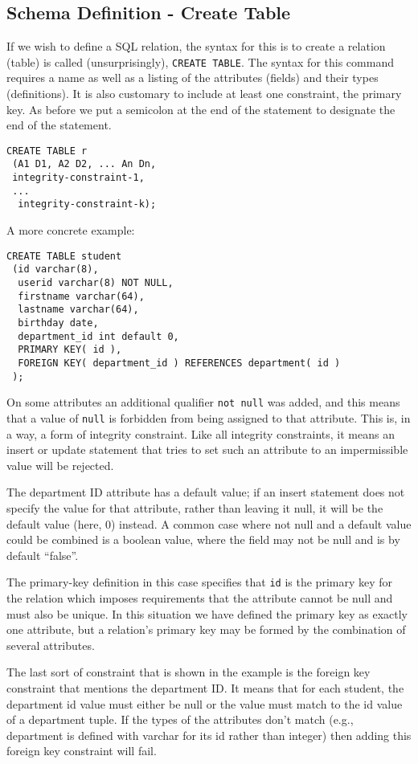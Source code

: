 \subsection*{Schema Definition - Create Table} 
If we wish to define a SQL relation, the syntax for this is to create a relation (table) is called (unsurprisingly), \texttt{CREATE TABLE}. The syntax for this command requires a name as well as a listing of the attributes (fields) and their types (definitions). It is also customary to include at least one constraint, the primary key. As before we put a semicolon at the end of the statement to designate the end of the statement. 

{\small
\begin{verbatim}
CREATE TABLE r
 (A1 D1, A2 D2, ... An Dn,
 integrity-constraint-1,
 ...
  integrity-constraint-k);
\end{verbatim}
}

A more concrete example: 
{\small
\begin{verbatim}
CREATE TABLE student
 (id varchar(8),
  userid varchar(8) NOT NULL,
  firstname varchar(64),
  lastname varchar(64),
  birthday date,
  department_id int default 0,
  PRIMARY KEY( id ),
  FOREIGN KEY( department_id ) REFERENCES department( id )
 );
\end{verbatim}
}


On some attributes an additional qualifier \texttt{not null} was added, and this means that a value of \texttt{null} is forbidden from being assigned to that attribute. This is, in a way, a form of integrity constraint. Like all integrity constraints, it means an insert or update statement that tries to set such an attribute to an impermissible value will be rejected. 

The department ID attribute has a default value; if an insert statement does not specify the value for that attribute, rather than leaving it null, it will be the default value (here, 0) instead. A common case where not null and a default value could be combined is a boolean value, where the field may not be null and is by default ``false''.

The primary-key definition in this case specifies that \texttt{id} is the primary key for the relation which imposes requirements that the attribute cannot be null and must also be unique. In this situation we have defined the primary key as exactly one attribute, but a relation's primary key may be formed by the combination of several attributes. 
 
The last sort of constraint that is shown in the example is the foreign key constraint that mentions the department ID. It means that for each student, the department id value must either be null or the value must match to the id value of a department tuple. If the types of the attributes don't match (e.g., department is defined with varchar for its id rather than integer) then adding this foreign key constraint will fail. 


